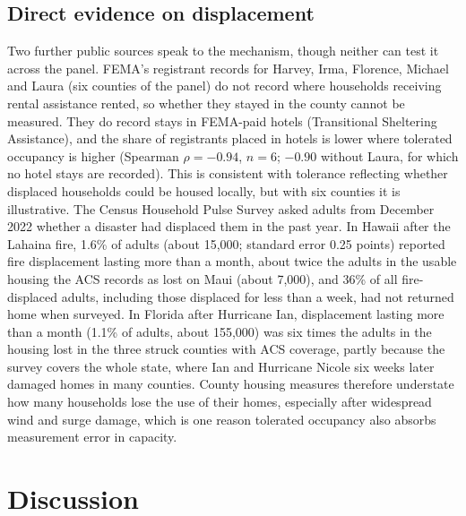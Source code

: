 \documentclass[11pt]{article}
\begin{document}
\subsection{Direct evidence on displacement}
Two further public sources speak to the mechanism, though neither can test it across the panel. FEMA's registrant records for Harvey, Irma, Florence, Michael and Laura (six counties of the panel) do not record where households receiving rental assistance rented, so whether they stayed in the county cannot be measured. They do record stays in FEMA-paid hotels (Transitional Sheltering Assistance), and the share of registrants placed in hotels is lower where tolerated occupancy is higher (Spearman $\rho=-0.94$, $n=6$; $-0.90$ without Laura, for which no hotel stays are recorded). This is consistent with tolerance reflecting whether displaced households could be housed locally, but with six counties it is illustrative. The Census Household Pulse Survey asked adults from December 2022 whether a disaster had displaced them in the past year. In Hawaii after the Lahaina fire, 1.6\% of adults (about 15{,}000; standard error 0.25 points) reported fire displacement lasting more than a month, about twice the adults in the usable housing the ACS records as lost on Maui (about 7{,}000), and 36\% of all fire-displaced adults, including those displaced for less than a week, had not returned home when surveyed. In Florida after Hurricane Ian, displacement lasting more than a month (1.1\% of adults, about 155{,}000) was six times the adults in the housing lost in the three struck counties with ACS coverage, partly because the survey covers the whole state, where Ian and Hurricane Nicole six weeks later damaged homes in many counties. County housing measures therefore understate how many households lose the use of their homes, especially after widespread wind and surge damage, which is one reason tolerated occupancy also absorbs measurement error in capacity.

\section{Discussion}
\end{document}
